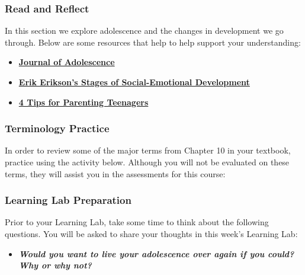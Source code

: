 \documentclass[
]{book}
\providecommand{\tightlist}{%
  \setlength{\itemsep}{0pt}\setlength{\parskip}{0pt}}
\begin{document}
\begin{reflect}
\hypertarget{read-and-reflect}{%
\subsubsection*{Read and Reflect}\label{read-and-reflect}}

In this section we explore adolescence and the changes in development we go through. Below are some resources that help to help support your understanding:

\begin{itemize}
\tightlist
\item
  \href{https://www.sciencedirect.com/journal/journal-of-adolescence}{\textbf{Journal of Adolescence}}\\
\item
  \href{https://childdevelopmentinfo.com/child-development/erickson/\#gs.d8mpcv}{\textbf{Erik Erikson's Stages of Social-Emotional Development}}\\
\item
  \href{http://drjamesdobson.org/quiz/parenting-quiz/4-tips-for-parenting-teenagers}{\textbf{4 Tips for Parenting Teenagers}}
\end{itemize}

\hypertarget{terminology-practice}{%
\subsubsection*{Terminology Practice}\label{terminology-practice}}

In order to review some of the major terms from Chapter 10 in your textbook, practice using the activity below. Although you will not be evaluated on these terms, they will assist you in the assessments for this course:

\hypertarget{learning-lab-preparation-2}{%
\subsubsection*{Learning Lab Preparation}\label{learning-lab-preparation-2}}

Prior to your Learning Lab, take some time to think about the following questions. You will be asked to share your thoughts in this week's Learning Lab:

\begin{itemize}
\tightlist
\item
  \textbf{\emph{Would you want to live your adolescence over again if you could? Why or why not?}}
\end{itemize}
\end{reflect}
\end{document}
